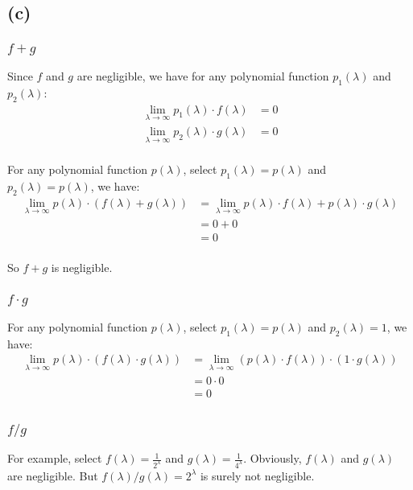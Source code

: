 \documentclass[a4paper,12pt]{article}
\begin{document}
\subsection{(c)}
\subsubsection{$f + g$}
Since $f$ and $g$ are negligible, we have for any polynomial function $p_1(\lambda)$ and $p_2(\lambda)$:
\begin{equation}
    \begin{aligned}
        \lim_{\lambda \to \infty}p_1(\lambda)\cdot f(\lambda) & = 0 \\
        \lim_{\lambda \to \infty}p_2(\lambda)\cdot g(\lambda) & = 0 \\
    \end{aligned}
\end{equation}

For any polynomial function $p(\lambda)$, select $p_1(\lambda) = p(\lambda)$ and $p_2(\lambda) = p(\lambda)$, we have:
\begin{equation}
    \begin{aligned}
        \lim_{\lambda \to \infty}p(\lambda)\cdot (f(\lambda) + g(\lambda)) & = \lim_{\lambda \to \infty}p(\lambda)\cdot f(\lambda) + p(\lambda)\cdot g(\lambda) \\
                                                                           & = 0 + 0                                                                            \\
                                                                           & = 0                                                                                \\
    \end{aligned}
\end{equation}

So $f + g$ is negligible.
\subsubsection{$f\cdot g$}
For any polynomial function $p(\lambda)$, select $p_1(\lambda) = p(\lambda)$ and $p_2(\lambda) = 1$, we have:
\begin{equation}
    \begin{aligned}
        \lim_{\lambda \to \infty}p(\lambda)\cdot (f(\lambda)\cdot g(\lambda)) & = \lim_{\lambda \to \infty}(p(\lambda)\cdot f(\lambda))\cdot (1 \cdot g(\lambda)) \\
                                                                              & = 0\cdot 0                                                                        \\
                                                                              & = 0                                                                               \\
    \end{aligned}
\end{equation}
\subsubsection{$f / g$}
For example, select $f(\lambda) = \frac{1}{2^\lambda}$ and $g(\lambda) = \frac{1}{4^\lambda}$. Obviously, $f(\lambda)$ and $g(\lambda)$ are negligible. But $f(\lambda) / g(\lambda) = 2^\lambda$ is surely not negligible.
\end{document}
